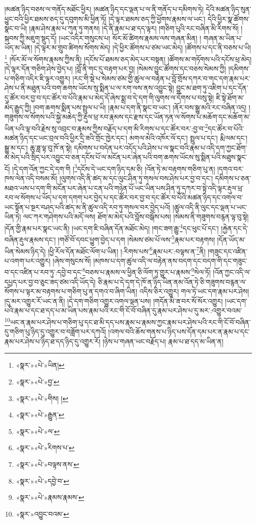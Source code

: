 །མཚན་ཉིད་བཅས་ལ་གནོད་མཐོང་ཕྱིར། །མཚན་ཉིད་དང་ལྡན་པ་ལ་ནི་གནོད་པ་དམིགས་ཏེ། དེའི་མཚན་ཉིད་སུན་ཕྱུང་བའི་ཕྱིར་ཐམས་ཅད་དུ་དབུགས་མི་ཕྱིན་ཏོ། །དེ་ལྟར་ཐམས་ཅད་ཀྱི་ཕྱོགས་རྣམས་ལ་ཡང་། དེའི་ཕྱིར་སྣ་ཚོགས་སྣང་བ་ཡི། །རྣམ་ཤེས་རྣམ་པ་ཀུན་ཏུ་གནས། །དེ་ནི་རྣམ་པ་ཐ་དད་ལྟར། །གཅིག་པུའི་རང་བཞིན་མི་རིགས་སོ། །སྐབས་ཀྱི་མཇུག་སྡུད་དོ། །ཡང་འདིར་གསུངས་པ། སོར་མོ་ཚིགས་རྣམས་ལས་གཞན་མིན། །
གཞན་མ་ཡིན་པ་ཡོད་མ་ཡིན། །དེ་ལྟར་མ་གྲུབ་ཚིགས་སོགས་མེད། །དེ་ཕྱིར་ཚོགས་པ་ཙམ་ཡང་མེད། །ཚོགས་པ་དང་ནི་བཅས་པ་ཡི།\footnote{«སྣར་»«པེ་»ཡིན།} །སོར་མོ་ལ་སོགས་རྣམས་ཀྱིས་ནི། །དངོས་པོ་ཐམས་ཅད་མེད་པར་བསྟན། །ཚོགས་མ་གཏོགས་པའི་དངོས་ཕྲ་མེད། །དེ་ལྟར་དོན་གཅིག་ཤེས་བྱེད་པ། །བློ་ནི་གང་དུ་བརྟག་པར་བྱ། །སེམས་བྱུང་ཚོགས་དང་བཅས་སེམས་ཀྱི། །དམིགས་པ་གཅིག་འདིར་ཇི་ལྟར་འགྱུར། །རང་གི་སྡེ་པ་སེམས་ཙམ་གྱི་ཚུལ་ལ་བརྟེན་པ་བློ་གྲོས་དཀར་བ་གང་དག་རྣམ་པར་ཤེས་པ་ནི་མཐུན་པའི་བག་ཆགས་ཡོངས་སུ་སྨིན་པ་ལ་རག་ལས་ནས་འབྱུང་སྟེ། བྱུང་མ་ཐག་ཏུ་འཇིག་པ་དང་དོན་དུ་ཚོར་བར་བྱ་བ་དང་ཚོར་བ་པོའི་རྣམ་པ་མེད་དོ་ཞེས་སྨྲ་བ་དེ་དག་གི་ལུགས་ལ་དོགས་པ་བསུ་སྟེ། ཇི་སྟེ་ཐོག་མ་མེད་རྒྱུད་ཀྱི། །བག་ཆགས་སྨིན་པས་སྤྲུལ་པ་ཡི། །རྣམ་པ་དག་ནི་སྣང་བ་ཡང་། །ནོར་བས་སྒྱུ་མའི་རང་བཞིན་འདྲ། །གཟུགས་ལ་སོགས་པའི་སྐྱེ་མཆེད་ཀྱི་རྡུལ་ཕྲ་རབ་རྣམས་དང་རྫས་དང་ཡོན་ཏན་ལ་སོགས་པ་མཆོག་དང་མཆོག་མ་ཡིན་པའི་ལྟ་བའི་རྗེས་སུ་འབྲང་བ་རྣམས་ཀྱིས་བརྗོད་པ་དག་མི་རིགས་པ་དང་ཚོར་བར་:བྱ་བ་\footnote{«སྣར་»«པེ་»བྱ་}དང་ཚོར་བ་པོའི་མཚན་ཉིད་དང་ཡང་བྲལ་བའི་ཕྱིར་དྲི་ཟའི་གྲོང་ཁྱེར་དང་། མགལ་མེའི་འཁོར་ལོ་དང་། སྤྲུལ་པ་དང་། རྨི་ལམ་དང་། སྒྱུ་མ་དང་། ཆུ་ཟླ་ལྟ་བུ་ཁོ་ན་སྟེ། དམིགས་པ་བདེན་པར་འདོད་པའི་ཤེས་པ་ལ་སྣང་བའི་རྣམ་པ་འདི་དག་ཀྱང་ཐོག་མ་མེད་པའི་སྲིད་པར་འབྱུང་བ་ཅན་དངོས་པོ་ལ་མངོན་པར་ཞེན་པའི་བག་ཆགས་ཡོངས་སུ་སྨིན་པའི་མཐུས་སྣང་ངོ། །དེ་དག་འོན་ཀྱང་དེ་དག་གི །\footnote{«སྣར་»«པེ་»གིས། །}དངོས་དེ་ཡང་དག་ཉིད་དམ་ཅི། །འོན་ཏེ་མ་བརྟགས་གཅིག་པུ་ན། །དགའ་བར་ཁས་ལེན་འདི་བསམ་མོ། །ལུགས་འདི་ནི་ཚད་མ་དང་ལུང་ཤིན་ཏུ་གསལ་བས་ཤེས་པར་བྱ་བ་དང་། དམིགས་པ་ཅན་མཐའ་ཡས་པ་དག་གི་མངོན་པར་ཞེན་པ་ངན་པའི་གཉེན་པོ་ཡང་ཡིན་པས་ཤིན་ཏུ་དཀར་བ་སྟེ་འདི་ལྟར་རྡུལ་ཕྲ་རབ་ལ་སོགས་པ་ཡོད་པ་དག་དགག་པར་བྱེད་པ་དང་ཚོར་བར་བྱ་བ་དང་ཚོར་བ་པོའི་མཚན་ཉིད་དང་འགལ་བ་ཡང་སྟོན་པ་སྔར་བཤད་པའི་ཚད་མ་ནི་ཚུལ་འདི་རབ་ཏུ་གསལ་བར་བྱེད་པའོ། །ཚུལ་འདི་ནི་ལུང་དང་ལྡན་པ་ཡང་ཡིན་ཏེ། ལང་ཀར་གཤེགས་པའི་མདོ་ལས། ཐོག་མ་མེད་པའི་བློས་བསྒོས་པས། །སེམས་ནི་གཟུགས་བརྙན་ལྟ་བུ་སྟེ། །དོན་གྱི་རྣམ་པར་སྣང་ཡང་ནི། །ཡང་དག་ཇི་བཞིན་དོན་མཐོང་མེད། །གང་ཟག་རྒྱུ་\footnote{«སྣར་»«པེ་»རྒྱུན་}དང་ཕུང་པོ་དང་། །རྐྱེན་དང་དེ་བཞིན་རྡུལ་རྣམས་དང་། །གཙོ་བོ་དབང་ཕྱུག་བྱེད་པ་དག །སེམས་ཙམ་པོ་ལས་\footnote{«སྣར་»«པེ་»ལ་}རྣམ་པར་བརྟགས། །དོན་ཡོད་མ་ཡིན་སེམས་ཉིད་དེ། །ཕྱི་རོལ་དོན་མཐོང་ལོག་པ་ཡིན། །:རིགས་པས་\footnote{«སྣར་»«པེ་»རིགས་པ་}རྣམ་པར་:བལྟས་ན་\footnote{«སྣར་»«པེ་»བལྟས་ནས་}ནི། །གཟུང་དང་འཛིན་པ་འགག་པར་འགྱུར། །ཞེས་གསུངས་སོ། །མཁས་པ་དག་ཚུལ་འདི་ལ་བརྟེན་ནས་བདག་དང་བདག་གི་དང་གཟུང་བ་དང་འཛིན་པ་རབ་ཏུ་:དབྱེ་བ་དང་\footnote{«སྣར་»«པེ་»དབྱེ་བ་}བཅས་པ་རྣམས་ལ་ཕྱིན་ཅི་ལོག་ཏུ་གྱུར་པ་རྣམས་\footnote{«སྣར་»«པེ་»རྣམས་རྣམས་}སེལ་ཏོ། །འོན་ཀྱང་འདི་ལ་དཔྱད་པར་བྱ་བ་ཅུང་ཟད་ཙམ་འདི་ཡོད་དེ། ཅི་རྣམ་པ་དེ་དག་དེ་ཁོ་ན་ཉིད་ཡིན་ནམ་འོན་ཏེ་ཅི་གཟུགས་བརྙན་ལ་སོགས་པ་ལྟར་མ་བརྟགས་པ་གཅིག་པུ་ན་དགའ་བ་ཞིག་ཡིན། འདིས་ཅིར་འགྱུར། གལ་ཏེ་ཡང་དག་རྣམ་པར་ཤེས། །དུ་མར་འགྱུར་རོ་ཡང་ན་ནི། །དེ་དག་གཅིག་འགྱུར་འགལ་ལྡན་པས། །གདོན་མི་ཟ་བར་སོ་སོར་འགྱུར། །ཡང་དག་པའི་རྣམ་པ་དང་ཐ་དད་པ་མ་ཡིན་པས་རྣམ་པའི་རང་གི་ངོ་བོ་བཞིན་དུ་རྣམ་པར་ཤེས་པ་དུ་མར་:འགྱུར་བའམ་\footnote{«སྣར་»འབྱུང་བའམ་}ཡང་ན་རྣམ་པར་ཤེས་པ་གཅིག་པུ་དང་ཐ་མི་དད་པས་རྣམ་པ་རྣམས་ཀྱང་རྣམ་པར་ཤེས་པའི་རང་གི་ངོ་བོ་བཞིན་དུ་གཅིག་པུ་ཉིད་དུ་འགྱུར་བ་བཟློག་པར་དཀའོ། །འགལ་བའི་ཆོས་གནས་པ་ཉིད་པས་དོན་དམ་པར་ན་རྣམ་པ་དང་རྣམ་པར་ཤེས་པ་ཉིད་ཐ་དད་ཉིད་དུ་འགྱུར་རོ། །ཉེས་པ་གཞན་ཡང་བརྗོད་པ། རྣམ་པ་ཐ་དད་མ་ཡིན་ན། 